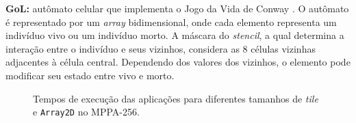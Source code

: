 \documentclass[12pt]{article}
\newcommand{\mppa}{MPPA-256\xspace}
\newcommand{\stencil}{\textit{stencil}\xspace}
\begin{document}
\textbf{GoL:} autômato celular que implementa o Jogo da Vida de Conway
\cite{gardner70}. O autômato é representado por um \textit{array} bidimensional,
onde cada elemento representa um indivíduo vivo ou um indivíduo morto. A máscara
do \stencil, a qual determina a interação entre o indivíduo e seus vizinhos,
considera as $8$ células vizinhas adjacentes à célula central. Dependendo dos
valores dos vizinhos, o elemento pode modificar seu estado entre vivo e
morto.\\

\begin{figure}[t]
	\centering
	\qquad
    \qquad
	\caption{Tempos de execução das aplicações para diferentes tamanhos de \textit{tile} e \texttt{Array2D} no \mppa.}
	\label{fig:timeBox}
\end{figure}
\end{document}
